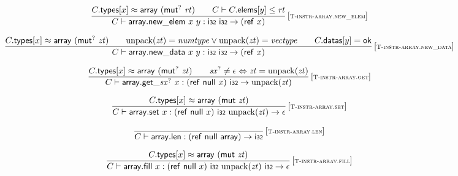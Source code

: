 $$
\begin{array}{@{}c@{}}\displaystyle
\frac{
C{.}\mathsf{types}{}[x] \approx \mathsf{array}~({\mathsf{mut}^?}~{\mathit{rt}})
 \qquad
C \vdash C{.}\mathsf{elems}{}[y] \leq {\mathit{rt}}
}{
C \vdash \mathsf{array{.}new\_elem}~x~y : \mathsf{i{\scriptstyle 32}}~\mathsf{i{\scriptstyle 32}} \rightarrow (\mathsf{ref}~x)
} \, {[\textsc{\scriptsize T{-}instr{-}array.new\_elem}]}
\qquad
\end{array}
$$

$$
\begin{array}{@{}c@{}}\displaystyle
\frac{
C{.}\mathsf{types}{}[x] \approx \mathsf{array}~({\mathsf{mut}^?}~{\mathit{zt}})
 \qquad
{\mathrm{unpack}}({\mathit{zt}}) = {\mathit{numtype}} \lor {\mathrm{unpack}}({\mathit{zt}}) = {\mathit{vectype}}
 \qquad
C{.}\mathsf{datas}{}[y] = \mathsf{ok}
}{
C \vdash \mathsf{array{.}new\_data}~x~y : \mathsf{i{\scriptstyle 32}}~\mathsf{i{\scriptstyle 32}} \rightarrow (\mathsf{ref}~x)
} \, {[\textsc{\scriptsize T{-}instr{-}array.new\_data}]}
\qquad
\end{array}
$$

$$
\begin{array}{@{}c@{}}\displaystyle
\frac{
C{.}\mathsf{types}{}[x] \approx \mathsf{array}~({\mathsf{mut}^?}~{\mathit{zt}})
 \qquad
{{\mathit{sx}}^?} \neq \epsilon \Leftrightarrow {\mathit{zt}} = {\mathrm{unpack}}({\mathit{zt}})
}{
C \vdash {\mathsf{array{.}get}}{\mathsf{\_}}{{{\mathit{sx}}^?}}~x : (\mathsf{ref}~\mathsf{null}~x)~\mathsf{i{\scriptstyle 32}} \rightarrow {\mathrm{unpack}}({\mathit{zt}})
} \, {[\textsc{\scriptsize T{-}instr{-}array.get}]}
\qquad
\end{array}
$$

$$
\begin{array}{@{}c@{}}\displaystyle
\frac{
C{.}\mathsf{types}{}[x] \approx \mathsf{array}~(\mathsf{mut}~{\mathit{zt}})
}{
C \vdash \mathsf{array{.}set}~x : (\mathsf{ref}~\mathsf{null}~x)~\mathsf{i{\scriptstyle 32}}~{\mathrm{unpack}}({\mathit{zt}}) \rightarrow \epsilon
} \, {[\textsc{\scriptsize T{-}instr{-}array.set}]}
\qquad
\end{array}
$$

$$
\begin{array}{@{}c@{}}\displaystyle
\frac{
}{
C \vdash \mathsf{array{.}len} : (\mathsf{ref}~\mathsf{null}~\mathsf{array}) \rightarrow \mathsf{i{\scriptstyle 32}}
} \, {[\textsc{\scriptsize T{-}instr{-}array.len}]}
\qquad
\end{array}
$$

$$
\begin{array}{@{}c@{}}\displaystyle
\frac{
C{.}\mathsf{types}{}[x] \approx \mathsf{array}~(\mathsf{mut}~{\mathit{zt}})
}{
C \vdash \mathsf{array{.}fill}~x : (\mathsf{ref}~\mathsf{null}~x)~\mathsf{i{\scriptstyle 32}}~{\mathrm{unpack}}({\mathit{zt}})~\mathsf{i{\scriptstyle 32}} \rightarrow \epsilon
} \, {[\textsc{\scriptsize T{-}instr{-}array.fill}]}
\qquad
\end{array}
$$

